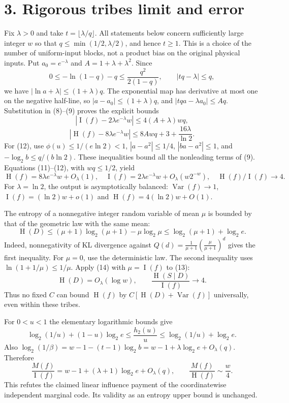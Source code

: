 \documentclass[11pt]{article}
\newcommand{\I}{\operatorname{I}}
\newcommand{\Var}{\operatorname{Var}}
\newcommand{\HH}{\operatorname{H}}
\begin{document}
\section*{3. Rigorous tribes limit and error}
Fix $\lambda>0$ and take $t=\lfloor\lambda/q\rfloor$.
All statements below concern sufficiently large integer $w$ so that
$q\le\min(1/2,\lambda/2)$, and hence $t\ge1$.
This is a choice of the number of uniform-input blocks, not a
product bias on the original physical inputs.
Put $a_0=e^{-\lambda}$ and $A=1+\lambda+\lambda^2$.
Since
\[
 0\le-\ln(1-q)-q\le\frac{q^2}{2(1-q)},\qquad |tq-\lambda|\le q,
\]
we have $|\ln a+\lambda|\le(1+\lambda)q$.
The exponential map has derivative at most one on the negative
half-line, so $|a-a_0|\le(1+\lambda)q$, and
$|tqa-\lambda a_0|\le A q$.
Substitution in (8)--(9) proves the explicit bounds
\[
 \left|\I(f)-2\lambda e^{-\lambda}w\right|
       \le4(A+\lambda)wq,                                    \tag{11}
\]
\[
 \left|\HH(f)-8\lambda e^{-\lambda}w\right|
       \le8Awq+3+\frac{16\lambda}{\ln2}.                      \tag{12}
\]
For (12), use $\phi(u)\le1/(e\ln2)<1$,
$|a-a^2|\le1/4$, $|ba-a^2|\le1$,
and $-\log_2 b\le q/(b\ln2)$. These inequalities bound all
the nonleading terms of (9). Equations (11)--(12), with
$wq\le1/2$, yield
\[
 \HH(f)=8\lambda e^{-\lambda}w+O_\lambda(1),\quad
 \I(f)=2\lambda e^{-\lambda}w+O_\lambda(w2^{-w}),\quad
 \HH(f)/\I(f)\longrightarrow4.                              \tag{13}
\]
For $\lambda=\ln2$, the output is asymptotically balanced:
$\Var(f)\to1$, $\I(f)=(\ln2)w+o(1)$ and
$\HH(f)=4(\ln2)w+O(1)$.

The entropy of a nonnegative integer random variable of mean $\mu$
is bounded by that of the geometric law with the same mean:
\[
 \HH(D)\le(\mu+1)\log_2(\mu+1)-\mu\log_2\mu
       \le\log_2(\mu+1)+\log_2 e.                            \tag{14}
\]
Indeed, nonnegativity of KL divergence against
$Q(d)=\frac1{\mu+1}(\frac{\mu}{\mu+1})^d$ gives the first
inequality. For $\mu=0$, use the deterministic law. The second
inequality uses $\ln(1+1/\mu)\le1/\mu$.
Apply (14) with $\mu=\I(f)$ to (13):
\[
 \HH(D)=O_\lambda(\log w),\qquad
 \frac{\HH(S\mid D)}{\I(f)}\longrightarrow4.                 \tag{15}
\]
Thus no fixed $C$ can bound $\HH(f)$ by
$C[\HH(D)+\Var(f)]$ universally, even within these tribes.

For $0<u<1$ the elementary logarithmic bounds give
\[
 \log_2(1/u)+(1-u)\log_2 e
 \le\frac{h_2(u)}u\le\log_2(1/u)+\log_2 e.                  \tag{16}
\]
Also $\log_2(1/\beta)=w-1-(t-1)\log_2 b
=w-1+\lambda\log_2e+O_\lambda(q)$. Therefore
\[
 \frac{M(f)}{\I(f)}=w-1+(\lambda+1)\log_2e+O_\lambda(q),
 \qquad \frac{M(f)}{\HH(f)}\sim\frac w4.                    \tag{17}
\]
This refutes the claimed linear influence payment of the
coordinatewise independent marginal code. Its validity as an
entropy upper bound is unchanged.
\end{document}
